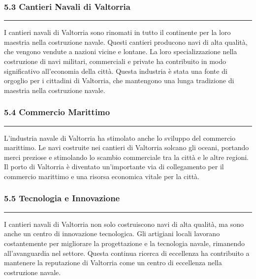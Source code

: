 \subsubsection{\texorpdfstring{5.3 \textbf{Cantieri Navali di
Valtorria}}{5.3 Cantieri Navali di Valtorria}}\label{cantieri-navali-di-valtorria}

\begin{center}\rule{0.5\linewidth}{0.5pt}\end{center}

I cantieri navali di Valtorria sono rinomati in tutto il continente per
la loro maestria nella costruzione navale. Questi cantieri producono
navi di alta qualità, che vengono vendute a nazioni vicine e lontane. La
loro specializzazione nella costruzione di navi militari, commerciali e
private ha contribuito in modo significativo all'economia della città.
Questa industria è stata una fonte di orgoglio per i cittadini di
Valtorria, che mantengono una lunga tradizione di maestria nella
costruzione navale.

\subsubsection{\texorpdfstring{5.4 \textbf{Commercio
Marittimo}}{5.4 Commercio Marittimo}}\label{commercio-marittimo}

\begin{center}\rule{0.5\linewidth}{0.5pt}\end{center}

L'industria navale di Valtorria ha stimolato anche lo sviluppo del
commercio marittimo. Le navi costruite nei cantieri di Valtorria solcano
gli oceani, portando merci preziose e stimolando lo scambio commerciale
tra la città e le altre regioni. Il porto di Valtorria è diventato
un'importante via di collegamento per il commercio marittimo e una
risorsa economica vitale per la città.

\subsubsection{\texorpdfstring{5.5 \textbf{Tecnologia e
Innovazione}}{5.5 Tecnologia e Innovazione}}\label{tecnologia-e-innovazione}

\begin{center}\rule{0.5\linewidth}{0.5pt}\end{center}

I cantieri navali di Valtorria non solo costruiscono navi di alta
qualità, ma sono anche un centro di innovazione tecnologica. Gli
artigiani locali lavorano costantemente per migliorare la progettazione
e la tecnologia navale, rimanendo all'avanguardia nel settore. Questa
continua ricerca di eccellenza ha contribuito a mantenere la reputazione
di Valtorria come un centro di eccellenza nella costruzione navale.

